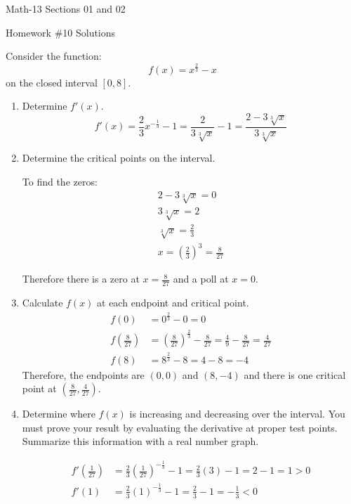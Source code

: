 \documentclass[letterpaper,12pt,fleqn]{article}
\begin{document}
\begin{center}
  \large
  Math-13 Sections 01 and 02

  \Large
  Homework \#10 Solutions
\end{center}

\vspace{0.5in}

Consider the function:
\[f(x)=x^{\frac{2}{3}}-x\]
on the closed interval \([0,8]\).
\begin{enumerate}[left=0in]
\item Determine \(f'(x)\).
  \[f'(x)=\frac{2}{3}x^{-\frac{1}{3}}-1=\frac{2}{3\sqrt[3]{x}}-1=\frac{2-3\sqrt[3]{x}}{3\sqrt[3]{x}}\]
\item Determine the critical points on the interval.

  To find the zeros:
  \begin{gather*}
    2-3\sqrt[3]{x}=0 \\
    3\sqrt[3]{x}=2 \\
    \sqrt[3]{x}=\frac{2}{3} \\
    x=\left(\frac{2}{3}\right)^3=\frac{8}{27}
  \end{gather*}

  Therefore there is a zero at \(x=\frac{8}{27}\) and a poll at \(x=0\).

\item Calculate \(f(x)\) at each endpoint and critical point.
  \begin{align*}
    f(0) &= 0^{\frac{2}{3}}-0=0 \\
    f\left(\frac{8}{27}\right) &= \left(\frac{8}{27}\right)^{\frac{2}{3}}-\frac{8}{27}=\frac{4}{9}-\frac{8}{27}=
    \frac{4}{27} \\
    f(8) &= 8^{\frac{2}{3}}-8=4-8=-4
  \end{align*}
  Therefore, the endpoints are \((0,0)\) and \((8,-4)\) and there is one critical point at
  \(\left(\frac{8}{27},\frac{4}{27}\right)\).
\item Determine where \(f(x)\) is increasing and decreasing over the interval.  You must prove your result by
  evaluating the derivative at proper test points.  Summarize this information with a real number graph.

  \begin{center}
  \end{center}
  \begin{align*}
    f'\left(\frac{1}{27}\right) &= \frac{2}{3}\left(\frac{1}{27}\right)^{-\frac{1}{3}}-1=\frac{2}{3}(3)-1=2-1=1>0 \\
    f'(1) &= \frac{2}{3}(1)^{-\frac{1}{3}}-1=\frac{2}{3}-1=-\frac{1}{3}<0
  \end{align*}
  

\end{enumerate}
\end{document}
